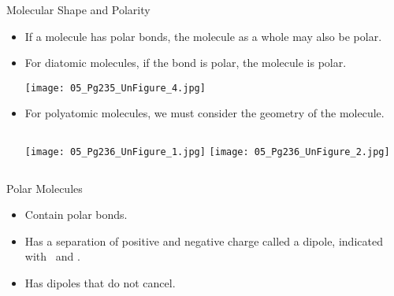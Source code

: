 \documentclass[notes=show]{beamer}
\begin{document}
%
%

\begin{frame}{Molecular Shape and Polarity}
	\begin{itemize}
		\item If a molecule has polar bonds, the molecule as a whole may
			also be polar. \pause
		\item For diatomic molecules, if the bond is polar, the molecule
			is polar.

			\begin{center}
				\texttt{[image: 05\_Pg235\_UnFigure\_4.jpg]}
			\end{center}

			\pause

		\item For polyatomic molecules, we must consider the
			\alert{geometry} of the molecule.

			\begin{columns}
				\centering
				\texttt{[image: 05\_Pg236\_UnFigure\_1.jpg]}
				\centering
				\texttt{[image: 05\_Pg236\_UnFigure\_2.jpg]}
			\end{columns}
	\end{itemize}
\end{frame}

\begin{frame}{Polar Molecules}
	\begin{itemize}
		\item Contain \alert{polar} bonds.
		\item Has a separation of positive and negative charge called a
			dipole, indicated with \delp\ and \delm.
		\item Has dipoles that \alert{do not} cancel.
	\end{itemize}

	\bigskip

	\begin{center}
		\hspace{5em}
	\end{center}
\end{frame}
\end{document}
